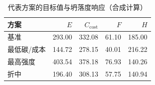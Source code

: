 \begin{table}[htbp]
  \centering
  \caption{代表方案的目标值与坍落度响应（合成计算）}
  \label{tab:performance}
  \begin{tabular}{@{}lrrrr@{}}
    \toprule
    方案 & $E$ & $C_{\mathrm{cost}}$ & $F$ & $H$\\
    \midrule
    基准 & 293.00 & 332.08 & 61.10 & 185.00\\
    最低碳/成本 & 144.72 & 278.15 & 40.01 & 216.22\\
    最高强度 & 403.54 & 378.18 & 76.93 & 140.26\\
    折中 & 196.40 & 308.13 & 57.75 & 140.94\\
    \bottomrule
  \end{tabular}
\end{table}
